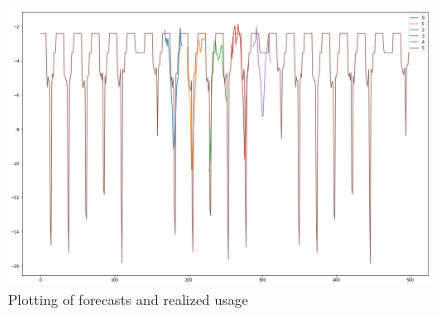 \begin{figure}
    \centering
    \includegraphics[width =1.0\linewidth]{img/pred1.png}
    \caption{Plotting of forecasts and realized usage}
    \label{fig:imgcombined_model}
\end{figure}



%


